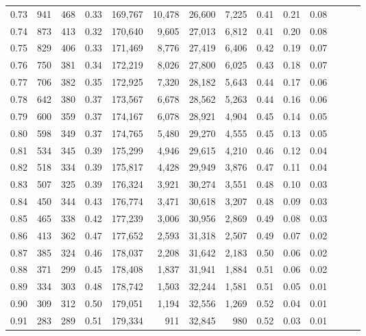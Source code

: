 \begin{tabular}{rrrrrrrrrrrrrr}
0.73 &    941 &  468 &  0.33 &  169,767 &   10,478 &  26,600 &   7,225 &  0.41 &  0.21 &      0.08 \\
0.74 &    873 &  413 &  0.32 &  170,640 &    9,605 &  27,013 &   6,812 &  0.41 &  0.20 &      0.08 \\
0.75 &    829 &  406 &  0.33 &  171,469 &    8,776 &  27,419 &   6,406 &  0.42 &  0.19 &      0.07 \\
0.76 &    750 &  381 &  0.34 &  172,219 &    8,026 &  27,800 &   6,025 &  0.43 &  0.18 &      0.07 \\
0.77 &    706 &  382 &  0.35 &  172,925 &    7,320 &  28,182 &   5,643 &  0.44 &  0.17 &      0.06 \\
0.78 &    642 &  380 &  0.37 &  173,567 &    6,678 &  28,562 &   5,263 &  0.44 &  0.16 &      0.06 \\
0.79 &    600 &  359 &  0.37 &  174,167 &    6,078 &  28,921 &   4,904 &  0.45 &  0.14 &      0.05 \\
0.80 &    598 &  349 &  0.37 &  174,765 &    5,480 &  29,270 &   4,555 &  0.45 &  0.13 &      0.05 \\
0.81 &    534 &  345 &  0.39 &  175,299 &    4,946 &  29,615 &   4,210 &  0.46 &  0.12 &      0.04 \\
0.82 &    518 &  334 &  0.39 &  175,817 &    4,428 &  29,949 &   3,876 &  0.47 &  0.11 &      0.04 \\
0.83 &    507 &  325 &  0.39 &  176,324 &    3,921 &  30,274 &   3,551 &  0.48 &  0.10 &      0.03 \\
0.84 &    450 &  344 &  0.43 &  176,774 &    3,471 &  30,618 &   3,207 &  0.48 &  0.09 &      0.03 \\
0.85 &    465 &  338 &  0.42 &  177,239 &    3,006 &  30,956 &   2,869 &  0.49 &  0.08 &      0.03 \\
0.86 &    413 &  362 &  0.47 &  177,652 &    2,593 &  31,318 &   2,507 &  0.49 &  0.07 &      0.02 \\
0.87 &    385 &  324 &  0.46 &  178,037 &    2,208 &  31,642 &   2,183 &  0.50 &  0.06 &      0.02 \\
0.88 &    371 &  299 &  0.45 &  178,408 &    1,837 &  31,941 &   1,884 &  0.51 &  0.06 &      0.02 \\
0.89 &    334 &  303 &  0.48 &  178,742 &    1,503 &  32,244 &   1,581 &  0.51 &  0.05 &      0.01 \\
0.90 &    309 &  312 &  0.50 &  179,051 &    1,194 &  32,556 &   1,269 &  0.52 &  0.04 &      0.01 \\
0.91 &    283 &  289 &  0.51 &  179,334 &      911 &  32,845 &     980 &  0.52 &  0.03 &      0.01 \\

\end{tabular}
